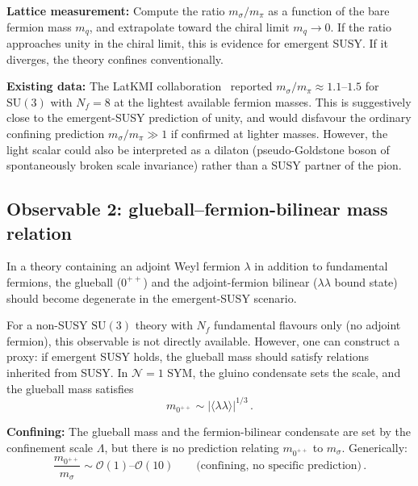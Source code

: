 \documentclass[11pt,a4paper]{article}
\theoremstyle{plain}
\theoremstyle{definition}
\theoremstyle{remark}
\newcommand{\Nf}{N_{\!f}}
\newcommand{\SU}[1]{\mathrm{SU}(#1)}
\begin{document}
\textbf{Lattice measurement:}  Compute the ratio $m_\sigma / m_\pi$
as a function of the bare fermion mass $m_q$, and extrapolate toward
the chiral limit $m_q \to 0$.  If the ratio approaches unity in the
chiral limit, this is evidence for emergent SUSY.  If it diverges, the
theory confines conventionally.

\textbf{Existing data:}  The LatKMI collaboration~\cite{LatKMI2014_Nf8}
reported $m_\sigma / m_\pi \approx 1.1$--$1.5$ for $\SU{3}$ with
$\Nf = 8$ at the lightest available fermion masses.  This is
suggestively close to the emergent-SUSY prediction of unity, and would disfavour
the ordinary confining prediction $m_\sigma/m_\pi \gg 1$ if confirmed at lighter masses.  However, the
light scalar could also be interpreted as a dilaton (pseudo-Goldstone
boson of spontaneously broken scale invariance) rather than a SUSY
partner of the pion.


\subsection{Observable 2: glueball--fermion-bilinear mass relation}
\label{ssec:obs2}

In a theory containing an adjoint Weyl fermion $\lambda$ in addition
to fundamental fermions, the glueball ($0^{++}$) and the
adjoint-fermion bilinear ($\lambda\lambda$ bound state) should become
degenerate in the emergent-SUSY scenario.

For a non-SUSY $\SU{3}$ theory with $\Nf$ fundamental flavours
only (no adjoint fermion), this observable is not directly available.
However, one can construct a proxy: if emergent SUSY holds, the
glueball mass should satisfy relations inherited from SUSY.  In
$\mathcal{N}=1$ SYM, the gluino condensate sets the scale, and
the glueball mass satisfies~\cite{VY1982_spectrum}
\begin{equation}\label{eq:glueball-condensate}
  m_{0^{++}} \sim \left|\langle\lambda\lambda\rangle\right|^{1/3}\,.
\end{equation}

\textbf{Confining:}  The glueball mass and the fermion-bilinear
condensate are set by the confinement scale $\Lambda$, but there is
no prediction relating $m_{0^{++}}$ to $m_\sigma$.  Generically:
\begin{equation}
  \frac{m_{0^{++}}}{m_\sigma} \sim \mathcal{O}(1)\text{--}\mathcal{O}(10)
  \qquad\text{(confining, no specific prediction)}\,.
\end{equation}
\end{document}
